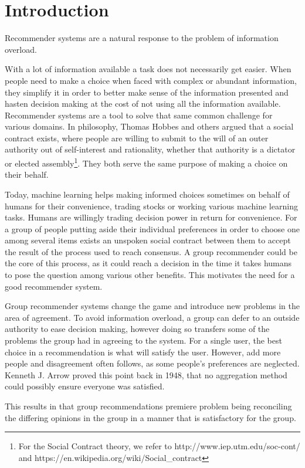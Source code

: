 \chapter{Introduction}
Recommender systems are a natural response to the problem of information overload.

With a lot of information available a task does not necessarily get easier. When people need to make a choice when faced with complex or abundant information, they simplify it in order to better make sense of the information presented and hasten decision making at the cost of not using all the information available. Recommender systems are a tool to solve that same common challenge for various domains. In philosophy, Thomas Hobbes and others argued that a social contract exists, where people are willing to submit to the will of an outer authority out of self-interest and rationality, whether that authority is a dictator or elected assembly\footnote{For the Social Contract theory, we refer to http://www.iep.utm.edu/soc-cont/ and https://en.wikipedia.org/wiki/Social\_contract}. They both serve the same purpose of making a choice on their behalf.

Today, machine learning helps making informed choices sometimes on behalf of humans for their convenience, trading stocks or working various machine learning tasks. Humans are willingly trading decision power in return for convenience. For a group of people putting aside their individual preferences in order to choose one among several items exists an unspoken social contract between them to accept the result of the process used to reach consensus. A group recommender could be the core of this process, as it could reach a decision in the time it takes humans to pose the question among various other benefits. This motivates the need for a good recommender system.

Group recommender systems change the game and introduce new problems in the area of agreement. To avoid information overload, a group can defer to an outside authority to ease decision making, however doing so transfers some of the problems the group had in agreeing to the system. For a single user, the best choice in a recommendation is what will satisfy the user. However, add more people and disagreement often follows, as some people's preferences are neglected. Kenneth J. Arrow proved this point back in 1948, that no aggregation method could possibly ensure everyone was satisfied\cite{arrow}.

This results in that group recommendations premiere problem being reconciling the differing opinions in the group in a manner that is satisfactory for the group.

